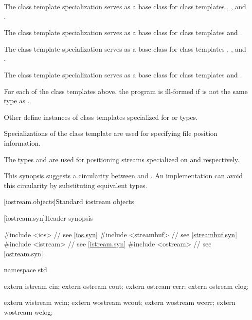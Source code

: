 \pnum
The
class template specialization
serves as a base class for class templates
,
,
and
.

\pnum
The
class template specialization
serves as a base class for class templates
and
.

\pnum
The
class template specialization
serves as a base class for class templates
,
,
and
.

\pnum
The
class template specialization
serves as a base class for class templates
and
.

\pnum
\begin{note}
For each of the class templates above,
the program is ill-formed if
is not the same type as
.
\end{note}

\pnum
Other  define instances of
class templates
specialized for
or
types.

\pnum
Specializations of the class template
are
used for specifying file position information.
\begin{example}
The types
and
are used for positioning streams specialized on
and
respectively.
\end{example}

\pnum
\begin{note}
This synopsis suggests a circularity between
and
.
An implementation can avoid this circularity by substituting equivalent
types.
\end{note}

[iostream.objects]{Standard iostream objects}

[iostream.syn]{Header  synopsis}

%
\begin{codeblock}
#include <ios>          // see \ref{ios.syn}
#include <streambuf>    // see \ref{streambuf.syn}
#include <istream>      // see \ref{istream.syn}
#include <ostream>      // see \ref{ostream.syn}

namespace std {
  extern istream cin;
  extern ostream cout;
  extern ostream cerr;
  extern ostream clog;

  extern wistream wcin;
  extern wostream wcout;
  extern wostream wcerr;
  extern wostream wclog;
}
\end{codeblock}

